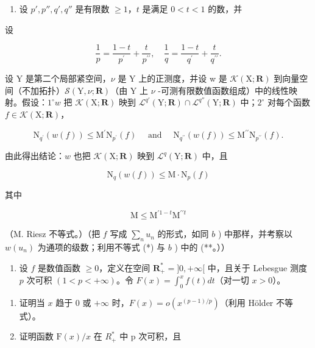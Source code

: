 \begin{enumerate}
\def\labelenumi{\alph{enumi})}
\setcounter{enumi}{2}
\tightlist
\item
  设 \(p', p'', q', q''\) 是有限数 \(\geqslant 1\)，\(t\) 是满足 \(0 < t < 1\) 的数，并
\end{enumerate}

设

\[
{\frac {1}{p}} = {\frac {1 - t}{p ^ {\prime}}} + {\frac {t}{p ^ {\prime \prime}}}, \quad {\frac {1}{q}} = {\frac {1 - t}{q ^ {\prime}}} + {\frac {t}{q ^ {\prime \prime}}}.
\]

设 Y 是第二个局部紧空间，\(\nu\) 是 Y 上的正测度，并设 w 是 \(\mathcal{K}(\mathrm{X};\mathbf{R})\) 到向量空间（不加拓扑）\(\mathcal{S}(\mathrm{Y},\nu;\mathbf{R})\)（由 Y 上 \(\nu\) -可测有限数值函数组成）中的线性映射。假设：\(1^{\circ}w\) 把 \(\mathcal{K}(\mathrm{X};\mathbf{R})\) 映到 \(\mathcal{L}^{q'}(\mathrm{Y};\mathbf{R})\cap\mathcal{L}^{q''}(\mathrm{Y};\mathbf{R})\) 中；\(2^{\circ}\) 对每个函数 \(f\in\mathcal{K}(\mathrm{X};\mathbf{R})\)，

\[
\mathrm{N} _ {q ^ {\prime}} (w (f)) \leqslant \mathrm{M} ^ {\prime} \mathrm{N} _ {p ^ {\prime}} (f) \quad \text { and } \quad \mathrm{N} _ {q ^ {\prime \prime}} (w (f)) \leqslant \mathrm{M} ^ {\prime \prime} \mathrm{N} _ {p ^ {\prime \prime}} (f).
\]

由此得出结论：\(w\) 也把 \(\mathcal{K}(\mathrm{X};\mathbf{R})\) 映到 \(\mathcal{L}^q (\mathrm{Y};\mathbf{R})\) 中，且

\[
\mathrm{N} _ {q} (w (f)) \leqslant \mathrm{M} \cdot \mathrm{N} _ {p} (f)
\]

其中

\[
\mathrm{M} \leqslant \mathrm{M} ^ {\prime 1 - t} \mathrm{M} ^ {\prime \prime t}
\]

（M. Riesz 不等式。）（把 \(f\) 写成 \(\sum_{n} u_n\) 的形式，如同 \(b\) ) 中那样，并考察以 \(w(u_n)\) 为通项的级数；利用不等式 (*) 与 \(b\) ) 中的 (**。））

\begin{enumerate}
\def\labelenumi{\arabic{enumi})}
\setcounter{enumi}{18}
\tightlist
\item
  设 \(f\) 是数值函数 \(\geqslant 0\)，定义在空间 \(\mathbf{R}_+^* = ]0, +\infty[\) 中，且关于 Lebesgue 测度 \(p\) 次可积 \((1 < p < +\infty)\)。令 \(F(x) = \int_0^x f(t) dt\)（对一切 \(x > 0\)）。
\end{enumerate}

\begin{enumerate}
\def\labelenumi{\alph{enumi})}
\item
  证明当 \(x\) 趋于 0 或 \(+\infty\) 时，\(F(x) = o(x^{(p - 1) / p})\)（利用 Hölder 不等式）。
\item
  证明函数 \(\mathrm{F}(x)/x\) 在 \(R_{+}^{*}\) 中 p 次可积，且
\end{enumerate}

